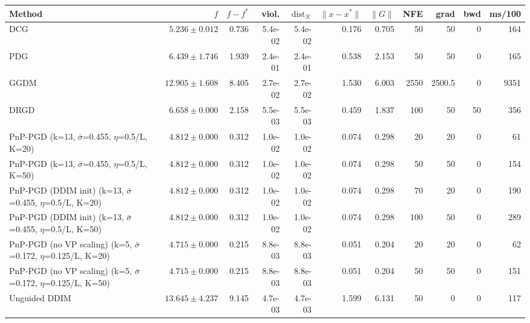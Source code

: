 \begin{tabular}{lrrrrrrrrrr}
\toprule
Method & $f$ & $f-f^*$ & viol. & $\mathrm{dist}_\mathcal{K}$ & $\|x-x^*\|$ & $\|G\|$ & NFE & grad & bwd & ms/100 \\
\midrule
DCG & $5.236\pm0.012$ & 0.736 & 5.4e-02 & 5.4e-02 & 0.176 & 0.705 & 50 & 50 & 0 & 164 \\
PDG & $6.439\pm1.746$ & 1.939 & 2.4e-01 & 2.4e-01 & 0.538 & 2.153 & 50 & 50 & 0 & 165 \\
GGDM & $12.905\pm1.608$ & 8.405 & 2.7e-02 & 2.7e-02 & 1.530 & 6.003 & 2550 & 2500.5 & 0 & 9351 \\
DRGD & $6.658\pm0.000$ & 2.158 & 5.5e-03 & 5.5e-03 & 0.459 & 1.837 & 100 & 50 & 50 & 356 \\
PnP-PGD (k=13, $\bar\sigma$=0.455, $\eta$=0.5/L, K=20) & $4.812\pm0.000$ & 0.312 & 1.0e-02 & 1.0e-02 & 0.074 & 0.298 & 20 & 20 & 0 & 61 \\
PnP-PGD (k=13, $\bar\sigma$=0.455, $\eta$=0.5/L, K=50) & $4.812\pm0.000$ & 0.312 & 1.0e-02 & 1.0e-02 & 0.074 & 0.298 & 50 & 50 & 0 & 154 \\
PnP-PGD (DDIM init) (k=13, $\bar\sigma$=0.455, $\eta$=0.5/L, K=20) & $4.812\pm0.000$ & 0.312 & 1.0e-02 & 1.0e-02 & 0.074 & 0.298 & 70 & 20 & 0 & 190 \\
PnP-PGD (DDIM init) (k=13, $\bar\sigma$=0.455, $\eta$=0.5/L, K=50) & $4.812\pm0.000$ & 0.312 & 1.0e-02 & 1.0e-02 & 0.074 & 0.298 & 100 & 50 & 0 & 289 \\
PnP-PGD (no VP scaling) (k=5, $\bar\sigma$=0.172, $\eta$=0.125/L, K=20) & $4.715\pm0.000$ & 0.215 & 8.8e-03 & 8.8e-03 & 0.051 & 0.204 & 20 & 20 & 0 & 62 \\
PnP-PGD (no VP scaling) (k=5, $\bar\sigma$=0.172, $\eta$=0.125/L, K=50) & $4.715\pm0.000$ & 0.215 & 8.8e-03 & 8.8e-03 & 0.051 & 0.204 & 50 & 50 & 0 & 151 \\
Unguided DDIM & $13.645\pm4.237$ & 9.145 & 4.7e-03 & 4.7e-03 & 1.599 & 6.131 & 50 & 0 & 0 & 117 \\
\bottomrule
\end{tabular}

